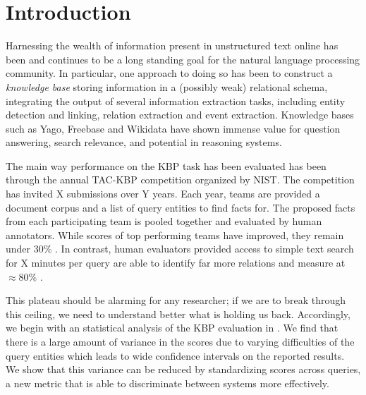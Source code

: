 \section{Introduction}
\label{sec:intro}

Harnessing the wealth of information present in unstructured text online has been and continues to be a long standing goal for the natural language processing community.
In particular, one approach to doing so has been to construct a \textit{knowledge base} storing information in a (possibly weak) relational schema, integrating the output of several information extraction tasks, including entity detection and linking, relation extraction and event extraction.
Knowledge bases such as Yago, Freebase and Wikidata have shown immense value for question answering, search relevance, and potential in reasoning systems\needcite.


The main way performance on the KBP task has been evaluated has been through the annual TAC-KBP competition organized by NIST.\@
The competition has invited X submissions over Y years.
Each year, teams are provided a document corpus and a list of query entities to find facts for.
The proposed facts from each participating team is pooled together and evaluated by human annotators.
While scores of top performing teams have improved, they remain under 30\% \fone.
In contrast, human evaluators provided access to simple text search for X minutes per query are able to identify far more relations and measure at $\approx$80\% \fone.

This plateau should be alarming for any researcher; if we are to break through this ceiling, we need to understand better what is holding us back.
Accordingly, we begin with an statistical analysis of the KBP evaluation in .
We find that there is a large amount of variance in the scores due to varying difficulties of the query entities which leads to wide confidence intervals on the reported results.
We show that this variance can be reduced by standardizing scores across queries, a new metric that is able to discriminate between systems  more effectively. 

